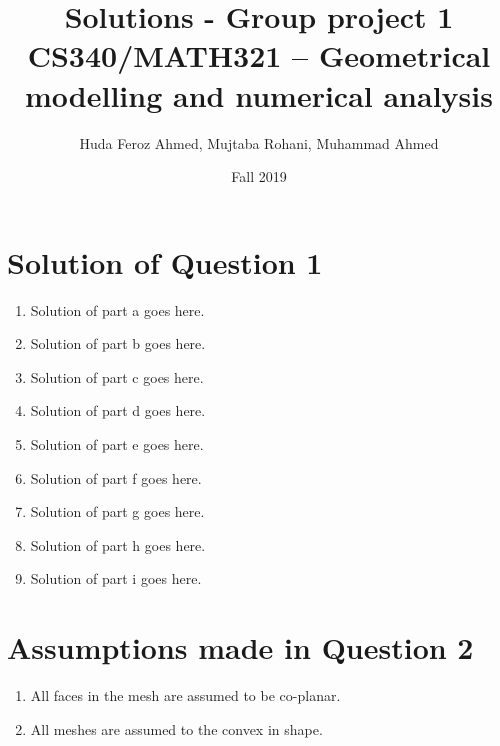 \documentclass[a4paper, 11pt]{article}
\title{Solutions - Group project 1\\CS340/MATH321 -- Geometrical modelling and numerical analysis}
\date{Fall 2019}
\author{Huda Feroz Ahmed, Mujtaba Rohani, Muhammad Ahmed}
\begin{document}
\maketitle  
\setlength{\parskip}{10pt}
\setlength{\parindent}{0pt}

\section*{Solution of Question 1}
    
\begin{enumerate}
    \item
    Solution of part a goes here.
    
    \item
    Solution of part b goes here.
    
    \item
    Solution of part c goes here.
    
    \item
    Solution of part d goes here.
    
    \item
    Solution of part e goes here.
    
    \item
    Solution of part f goes here.
    
    \item
    Solution of part g goes here.
    
    \item
    Solution of part h goes here.
    
    \item
    Solution of part i goes here.
    
\end{enumerate}

\section*{Assumptions made in Question 2}
    
\begin{enumerate}
    \item
    All faces in the mesh are assumed to be co-planar.
    \item
    All meshes are assumed to the convex in shape.
    
\end{enumerate}
\end{document}
